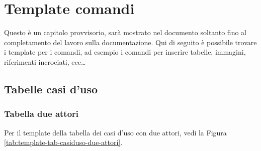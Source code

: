 
\chapter{Template comandi}
\label{chp:templateComandi}

Questo è un capitolo provvisorio, sarà mostrato nel documento soltanto fino al completamento del lavoro sulla documentazione. Qui di seguito è possibile trovare i template per i comandi, ad esempio i comandi per inserire tabelle, immagini, riferimenti incrociati, ecc\dots

\section{Tabelle casi d'uso}

\subsection{Tabella due attori}

Per il template della tabella dei casi d'uso con due attori, vedi la Figura \vref{tab:template-tab-casiduso-due-attori}.


